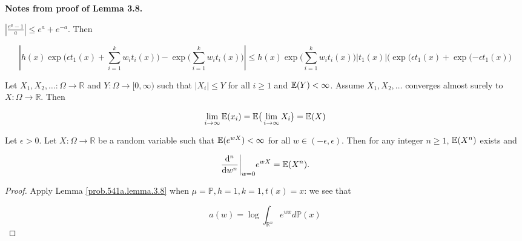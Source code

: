 \begin{remark}\textbf{Notes from proof of Lemma 3.8.} 



 \( \left| \frac{e^a - 1}{a} \right| \leq e^a + e^{-a}\). Then

\[
\left|   h(x) \exp\bigg( \epsilon t_1(x) + \sum_{i=1}^k w_i t_i(x) \bigg) - \exp \bigg( \sum_{i=1}^k w_i t_i(x) \bigg)  \right| \leq h(x) \exp \bigg( \sum_{i=1}^k w_i t_i(x) \bigg) |t_1(x) | \bigg( \exp(\epsilon t_1(x) + \exp(- \epsilon t_1(x) \bigg) 
\]



\end{remark}

\begin{theorem}\label{prob.dom.convg.thm} Let \(X_1, X_2, \ldots: \Omega \to \mathbb{R}\) and \(Y: \Omega \to [0, \infty)\) such that \(|X_i| \leq Y\) for all \(i \geq 1\) and \(\mathbb{E}(Y) < \infty\). Assume \(X_1, X_2, \ldots\) converges almost surely to \(X: \Omega \to \mathbb{R}\). Then 

\[
\lim_{i\to \infty} \mathbb{E}(x_i) = \mathbb{E} \big( \lim_{i \to \infty} X_i \big)= \mathbb{E}(X)
\]

\end{theorem}

\begin{corollary} Let \(\epsilon > 0\). Let \(X: \Omega \to \mathbb{R}\) be a random variable such that \(\mathbb{E}(e^{wX})  < \infty\) for all \(w \in (-\epsilon, \epsilon)\). Then for any integer \(n \geq 1\), \(\mathbb{E}(X^n)\) exists and

\[
\frac{\mathrm{d} ^n}{\mathrm{d} w^n} \bigg|_{w=0} e^{wX} = \mathbb{E}(X^n).
\]

\end{corollary}

\begin{proof} Apply Lemma \ref{prob.541a.lemma.3.8} when \(\mu = \mathbb{P}, h=1, k=1, t(x)=x\): we see that

\[
a(w) = \log \int_{\mathbb{R}^n}  e^{w x} d\mathbb{P}(x)
\]

\end{proof}

